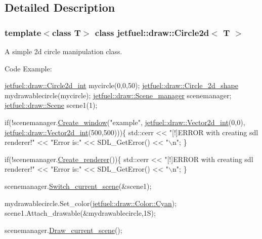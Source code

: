 \subsection{Detailed Description}
\subsubsection*{template$<$class T$>$\newline
class jetfuel\+::draw\+::\+Circle2d$<$ T $>$}

A simple 2d circle manipulation class.

Code Example\+: 
\begin{DoxyCode}
\hyperlink{classjetfuel_1_1draw_1_1Circle2d}{jetfuel::draw::Circle2d\_int} mycircle(0,0,50);
\hyperlink{classjetfuel_1_1draw_1_1Circle__2d__shape}{jetfuel::draw::Circle\_2d\_shape} mydrawablecircle(mycircle);
\hyperlink{classjetfuel_1_1draw_1_1Scene__manager}{jetfuel::draw::Scene\_manager} scenemanager;
\hyperlink{classjetfuel_1_1draw_1_1Scene}{jetfuel::draw::Scene} scene1(1);

\textcolor{keywordflow}{if}(!scenemanager.\hyperlink{classjetfuel_1_1draw_1_1Scene__manager_a5113e9062c272a22d383ba872417ba31}{Create\_window}(\textcolor{stringliteral}{"example"},
                         \hyperlink{classjetfuel_1_1draw_1_1Vector2d}{jetfuel::draw::Vector2d\_int}(0,0),
                         \hyperlink{classjetfuel_1_1draw_1_1Vector2d}{jetfuel::draw::Vector2d\_int}(500,500)))\{
   std::cerr << \textcolor{stringliteral}{"[!]ERROR with creating sdl renderer!"} <<
   \textcolor{stringliteral}{"Error is:"} << SDL\_GetError() << \textcolor{stringliteral}{"\(\backslash\)n"};
\}

  \textcolor{keywordflow}{if}(!scenemanager.\hyperlink{classjetfuel_1_1draw_1_1Scene__manager_afafecd926ce5e4b2543a6d583a7d24b6}{Create\_renderer}())\{
       std::cerr << \textcolor{stringliteral}{"[!]ERROR with creating sdl renderer!"} <<
      \textcolor{stringliteral}{"Error is:"} << SDL\_GetError() << \textcolor{stringliteral}{"\(\backslash\)n"};
  \}

scenemanager.\hyperlink{classjetfuel_1_1draw_1_1Scene__manager_a770c163b88ba8427539ee182315ea989}{Switch\_current\_scene}(&scene1);

mydrawablecircle.Set\_color(\hyperlink{classjetfuel_1_1draw_1_1Color_a9c9781b9377310494e8af2a5fe524ab4}{jetfuel::draw::Color::Cyan});
scene1.Attach\_drawable(&mydrawablecircle,1S);

scenemanager.\hyperlink{classjetfuel_1_1draw_1_1Scene__manager_a8af9a3abfd5121b1b8556342de435773}{Draw\_current\_scene}();
\end{DoxyCode}
 

